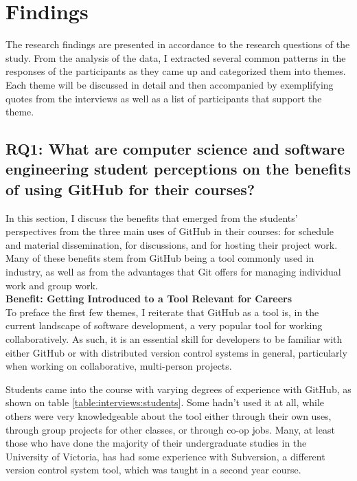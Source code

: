 \section{Findings}

The research findings are presented in accordance to the research questions of the study. From the analysis of the data, I extracted several common patterns in the responses of the participants as they came up and categorized them into themes. Each theme will be discussed in detail and then accompanied by exemplifying quotes from the interviews as well as a list of participants that support the theme.



\subsection{RQ1: What are computer science and software engineering student perceptions on the benefits of using GitHub for their courses?}
In this section, I discuss the benefits that emerged from the students' perspectives from the three main uses of GitHub in their courses: for schedule and material dissemination, for discussions, and for hosting their project work. Many of these benefits stem from GitHub being a tool commonly used in industry, as well as from the advantages that Git offers for managing individual work and group work. \\

\textbf{Benefit: Getting Introduced to a Tool Relevant for Careers} \\
To preface the first few themes, I reiterate that GitHub as a tool is, in the current landscape of software development, a very popular tool for working collaboratively. As such, it is an essential skill for developers to be familiar with either GitHub or with distributed version control systems in general, particularly when working on collaborative, multi-person projects.

Students came into the course with varying degrees of experience with GitHub, as shown on table \ref{table:interviews:students}. Some hadn't used it at all, while others were very knowledgeable about the tool either through their own uses, through group projects for other classes, or through co-op jobs. Many, at least those who have done the majority of their undergraduate studies in the University of Victoria, has had some experience with Subversion, a different version control system tool, which was taught in a second year course.

